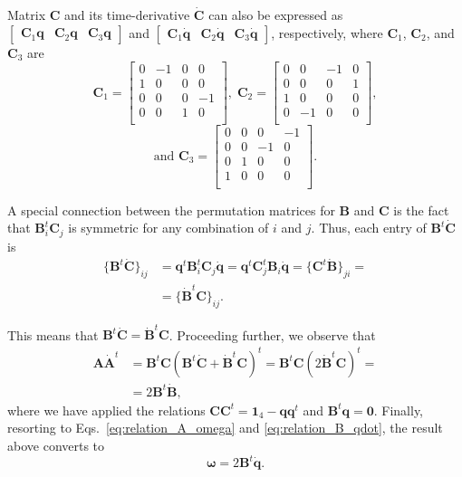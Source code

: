 \documentclass[aip,jcp,reprint,amsmath,amssymb,raggedbottom]{revtex4-1}
\newcommand{\mt}[1]{\boldsymbol{\mathbf{#1}}}           %
\newcommand{\vt}[1]{\boldsymbol{\mathbf{#1}}}           %
\newcommand{\tr}[1]{#1^t}                               %
\begin{document}
Matrix $\mt C$ and its time-derivative $\dot{\mt C}$ can also be expressed as $[\begin{array}{ccc}{\mt C}_1{\vt q} & {\mt C}_2{\vt q} & {\mt C}_3{\vt q}\end{array}]$ and $[\begin{array}{ccc}{\mt C}_1\dot{\vt q} & {\mt C}_2\dot{\vt q} & {\mt C}_3\dot{\vt q}\end{array}]$, respectively, where $\mt C_1$, $\mt C_2$, and $\mt C_3$ are
\[
{\mt C}_1 = \left[ \begin{array}{rrrr}
 0 & -1 &  0 &  0 \\
 1 &  0 &  0 &  0 \\
 0 &  0 &  0 & -1 \\
 0 &  0 &  1 &  0 \\
\end{array} \right], \;
{\mt C}_2 = \left[ \begin{array}{rrrr}
 0 &  0 & -1 &  0 \\
 0 &  0 &  0 &  1 \\
 1 &  0 &  0 &  0 \\
 0 & -1 &  0 &  0 \\
\end{array} \right],
\]\[
\text{and }{\mt C}_3 = \left[ \begin{array}{rrrr}
 0 &  0 &  0 & -1 \\
 0 &  0 & -1 &  0 \\
 0 &  1 &  0 &  0 \\
 1 &  0 &  0 &  0 \\
\end{array} \right].
\]

A special connection between the permutation matrices for $\mt B$ and $\mt C$ is the fact that $\tr{\mt B_i}{\mt C_j}$ is symmetric for any combination of $i$ and $j$. Thus, each entry of $\tr{\mt B}\dot{\mt C}$ is
\begin{align*}
\{\tr{\mt B}\dot{\mt C}\}_{ij} &= \tr{\vt q}\tr{\mt B}_i{\mt C}_j\dot{\vt q} = \tr{\vt q}\tr{\mt C}_j{\mt B}_i\dot{\vt q} = \{\tr{\mt C}\dot{\mt B}\}_{ji} = \\
&= \{\tr{\dot{\mt B}}\mt C\}_{ij}.
\end{align*}

This means that $\tr{\mt B}\dot{\mt C} = \tr{\dot{\mt B}}{\mt C}$. Proceeding further, we observe that
\begin{align*}
\mt A \tr{\dot{\mt A}} &= \tr{\mt B}\mt C \tr{(\tr{{\mt B}}\dot{\mt C} + \tr{\dot{\mt B}}{\mt C})} = \tr{\mt B}\mt C \tr{(2 \tr{\dot{\mt B}}{\mt C})} = \\
&= 2 \tr{\mt B}\dot{\mt B},
\end{align*}
where we have applied the relations $\mt C \tr{\mt C} = \mt 1_4 - \vt q\tr{\vt q}$ and $\tr{\vt B}\vt q = \vt 0$. Finally, resorting to Eqs.~\ref{eq:relation_A_omega} and \ref{eq:relation_B_qdot}, the result above converts to
\begin{equation}
\vt \omega = 2\tr{\mt B}\dot{\vt q}.
\end{equation}
\end{document}
